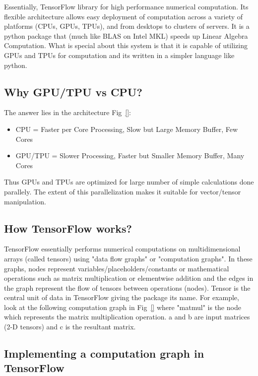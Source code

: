 \documentclass[10pt,letterpaper]{article}
\begin{document}
Essentially, TensorFlow library for high performance numerical computation. Its flexible architecture allows easy deployment of computation across a variety of platforms (CPUs, GPUs, TPUs), and from desktops to clusters of servers. It is a python package that (much like BLAS on Intel MKL) speeds up Linear Algebra Computation. What is special about this system is that it is capable of utilizing GPUs and TPUs for computation and its written in a simpler language like python.

\subsection*{Why GPU/TPU vs CPU?}

The answer lies in the architecture Fig~\ref{}:  
\begin{itemize}
\item CPU = Faster per Core Processing, Slow but Large Memory Buffer, Few Cores
\item GPU/TPU = Slower Processing, Faster but Smaller Memory Buffer, Many Cores
\end{itemize}

Thus GPUs and TPUs are optimized for large number of simple calculations done parallely. The extent of this  parallelization makes it suitable for vector/tensor manipulation.

\subsection*{How TensorFlow works?}

TensorFlow essentially performs numerical computations on multidimensional arrays (called tensors) using "data flow graphs" or "computation graphs". In these graphs, nodes represent variables/placeholders/constants or mathematical operations such as matrix multiplication or elementwise addition and the edges in the graph represent the flow of tensors between operations (nodes). Tensor is the central unit of data in TensorFlow giving the package its name. For example, look at the following computation graph in Fig~\ref{} where "matmul" is the node which represents the matrix multiplication operation. a and b are input matrices (2-D tensors) and c is the resultant matrix.

\subsection*{Implementing a computation graph in TensorFlow}
\end{document}
